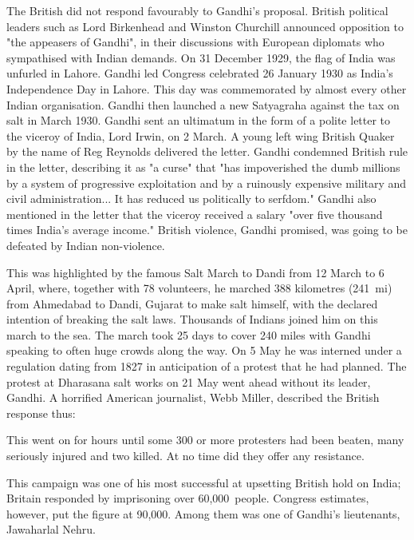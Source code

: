 The British did not respond favourably to Gandhi's proposal. British
political leaders such as Lord Birkenhead and Winston Churchill
announced opposition to "the appeasers of Gandhi", in their discussions
with European diplomats who sympathised with Indian demands. On 31
December 1929, the flag of India was unfurled in Lahore. Gandhi led
Congress celebrated 26 January 1930 as India's Independence Day in
Lahore. This day was commemorated by almost every other Indian
organisation. Gandhi then launched a new Satyagraha against the tax on
salt in March 1930. Gandhi sent an ultimatum in the form of a polite
letter to the viceroy of India, Lord Irwin, on 2 March. A young left
wing British Quaker by the name of Reg Reynolds delivered the letter.
Gandhi condemned British rule in the letter, describing it as "a curse"
that "has impoverished the dumb millions by a system of progressive
exploitation and by a ruinously expensive military and civil
administration... It has reduced us politically to serfdom." Gandhi also
mentioned in the letter that the viceroy received a salary "over five
thousand times India's average income." British violence, Gandhi
promised, was going to be defeated by Indian non-violence.

This was highlighted by the famous Salt March to Dandi from 12 March to
6 April, where, together with 78 volunteers, he marched 388 kilometres
(241~mi) from Ahmedabad to Dandi, Gujarat to make salt himself, with the
declared intention of breaking the salt laws. Thousands of Indians
joined him on this march to the sea. The march took 25 days to cover 240
miles with Gandhi speaking to often huge crowds along the way. On 5 May
he was interned under a regulation dating from 1827 in anticipation of a
protest that he had planned. The protest at Dharasana salt works on 21
May went ahead without its leader, Gandhi. A horrified American
journalist, Webb Miller, described the British response thus:

This went on for hours until some 300 or more protesters had been
beaten, many seriously injured and two killed. At no time did they offer
any resistance.

This campaign was one of his most successful at upsetting British hold
on India; Britain responded by imprisoning over 60,000~people. Congress
estimates, however, put the figure at 90,000. Among them was one of
Gandhi's lieutenants, Jawaharlal Nehru.

